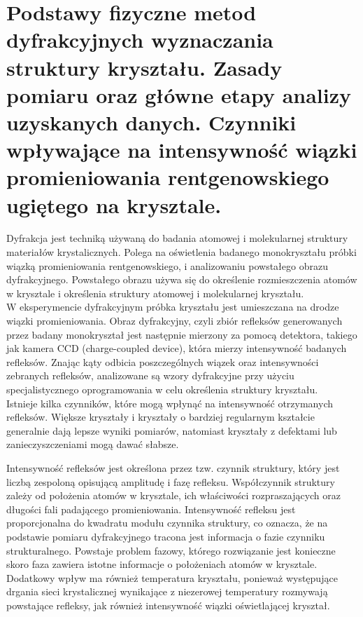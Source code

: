 \documentclass{article}
\begin{document}
\section{Podstawy fizyczne metod dyfrakcyjnych wyznaczania struktury kryształu. Zasady pomiaru oraz główne etapy analizy uzyskanych danych. Czynniki wpływające na intensywność wiązki promieniowania rentgenowskiego ugiętego na krysztale.}

\noindent Dyfrakcja jest techniką używaną do badania atomowej i molekularnej struktury materiałów krystalicznych. Polega na oświetlenia badanego monokryształu próbki wiązką promieniowania rentgenowskiego, i analizowaniu powstałego obrazu dyfrakcyjnego. Powstałego obrazu używa się do określenie rozmieszczenia atomów w krysztale i określenia struktury atomowej i molekularnej kryształu.\\

\noindent W eksperymencie dyfrakcyjnym próbka kryształu jest umieszczana na drodze wiązki promieniowania. Obraz dyfrakcyjny, czyli zbiór refleksów generowanych przez badany monokryształ jest następnie mierzony za pomocą detektora, takiego jak kamera CCD (charge-coupled device), która mierzy intensywność badanych refleksów. Znając kąty odbicia poszczególnych wiązek oraz intensywności zebranych refleksów, analizowane są wzory dyfrakcyjne przy użyciu specjalistycznego oprogramowania w celu określenia struktury kryształu. \\

\noindent Istnieje kilka czynników, które mogą wpłynąć na intensywność otrzymanych refleksów. Większe kryształy i kryształy o bardziej regularnym kształcie generalnie dają lepsze wyniki pomiarów, natomiast kryształy z defektami lub zanieczyszczeniami mogą dawać słabsze. 

\noindent Intensywność refleksów jest określona przez tzw. czynnik struktury, który jest liczbą zespoloną opisującą amplitudę i fazę refleksu. Współczynnik struktury zależy od położenia atomów w krysztale, ich właściwości rozpraszających oraz długości fali padającego promieniowania. Intensywność refleksu jest proporcjonalna do kwadratu modułu czynnika struktury, co oznacza, że na podstawie pomiaru dyfrakcyjnego tracona jest informacja o fazie czynniku strukturalnego. Powstaje problem fazowy, którego rozwiązanie jest konieczne skoro faza zawiera istotne informacje o położeniach atomów w krysztale. 
Dodatkowy wpływ ma również temperatura kryształu, ponieważ występujące drgania sieci krystalicznej wynikające z niezerowej temperatury rozmywają powstające refleksy, jak również intensywność wiązki oświetlającej kryształ.\\
\end{document}
